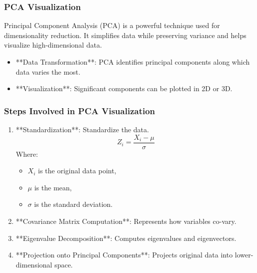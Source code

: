 \documentclass{beamer}
\begin{document}
\begin{frame}[fragile]
    \frametitle{PCA Visualization}
    Principal Component Analysis (PCA) is a powerful technique used for dimensionality reduction. It simplifies data while preserving variance and helps visualize high-dimensional data. 

    \begin{itemize}
        \item **Data Transformation**: PCA identifies principal components along which data varies the most.
        \item **Visualization**: Significant components can be plotted in 2D or 3D.
    \end{itemize}
\end{frame}

\begin{frame}[fragile]
    \frametitle{Steps Involved in PCA Visualization}
    \begin{enumerate}
        \item **Standardization**: Standardize the data.
            \begin{equation}
            Z_i = \frac{X_i - \mu}{\sigma}
            \end{equation}
            Where:
            \begin{itemize}
                \item \(X_i\) is the original data point,
                \item \(\mu\) is the mean,
                \item \(\sigma\) is the standard deviation.
            \end{itemize}
        
        \item **Covariance Matrix Computation**: Represents how variables co-vary.
        \item **Eigenvalue Decomposition**: Computes eigenvalues and eigenvectors.
        \item **Projection onto Principal Components**: Projects original data into lower-dimensional space.
    \end{enumerate}
\end{frame}
\end{document}
